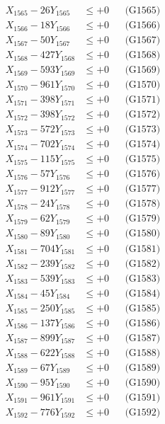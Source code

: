 \documentclass[a4paper,10pt]{article}
\begin{document}
{\begin{align}
X_{1565} - 26Y_{1565} &\leq +0 && \text{(G1565)} \\
X_{1566} - 18Y_{1566} &\leq +0 && \text{(G1566)} \\
X_{1567} - 50Y_{1567} &\leq +0 && \text{(G1567)} \\
X_{1568} - 427Y_{1568} &\leq +0 && \text{(G1568)} \\
X_{1569} - 593Y_{1569} &\leq +0 && \text{(G1569)} \\
X_{1570} - 961Y_{1570} &\leq +0 && \text{(G1570)} \\
\allowbreak
X_{1571} - 398Y_{1571} &\leq +0 && \text{(G1571)} \\
X_{1572} - 398Y_{1572} &\leq +0 && \text{(G1572)} \\
X_{1573} - 572Y_{1573} &\leq +0 && \text{(G1573)} \\
X_{1574} - 702Y_{1574} &\leq +0 && \text{(G1574)} \\
X_{1575} - 115Y_{1575} &\leq +0 && \text{(G1575)} \\
X_{1576} - 57Y_{1576} &\leq +0 && \text{(G1576)} \\
X_{1577} - 912Y_{1577} &\leq +0 && \text{(G1577)} \\
X_{1578} - 24Y_{1578} &\leq +0 && \text{(G1578)} \\
X_{1579} - 62Y_{1579} &\leq +0 && \text{(G1579)} \\
X_{1580} - 89Y_{1580} &\leq +0 && \text{(G1580)} \\
\allowbreak
X_{1581} - 704Y_{1581} &\leq +0 && \text{(G1581)} \\
X_{1582} - 239Y_{1582} &\leq +0 && \text{(G1582)} \\
X_{1583} - 539Y_{1583} &\leq +0 && \text{(G1583)} \\
X_{1584} - 45Y_{1584} &\leq +0 && \text{(G1584)} \\
X_{1585} - 250Y_{1585} &\leq +0 && \text{(G1585)} \\
X_{1586} - 137Y_{1586} &\leq +0 && \text{(G1586)} \\
X_{1587} - 899Y_{1587} &\leq +0 && \text{(G1587)} \\
X_{1588} - 622Y_{1588} &\leq +0 && \text{(G1588)} \\
X_{1589} - 67Y_{1589} &\leq +0 && \text{(G1589)} \\
X_{1590} - 95Y_{1590} &\leq +0 && \text{(G1590)} \\
\allowbreak
X_{1591} - 961Y_{1591} &\leq +0 && \text{(G1591)} \\
X_{1592} - 776Y_{1592} &\leq +0 && \text{(G1592)} \\

\end{align}}
\end{document}
